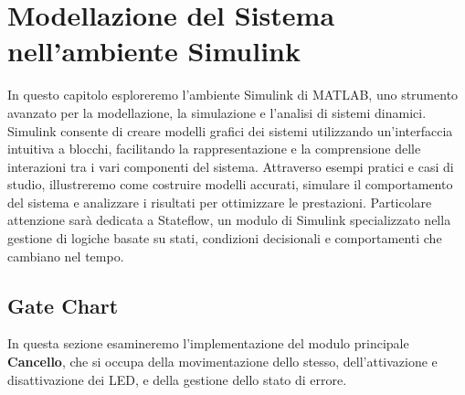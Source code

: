 \boldmath

\chapter{Modellazione del Sistema nell'ambiente Simulink}

    \noindent In questo capitolo esploreremo l'ambiente Simulink di MATLAB, uno strumento avanzato per la modellazione, la simulazione e l'analisi di sistemi dinamici. Simulink consente di creare modelli grafici dei sistemi utilizzando un'interfaccia intuitiva a blocchi, facilitando la rappresentazione e la comprensione delle interazioni tra i vari componenti del sistema. Attraverso esempi pratici e casi di studio, illustreremo come costruire modelli accurati, simulare il comportamento del sistema e analizzare i risultati per ottimizzare le prestazioni. Particolare attenzione sarà dedicata a Stateflow, un modulo di Simulink specializzato nella gestione di logiche basate su stati, condizioni decisionali e comportamenti che cambiano nel tempo.

    \section{Gate Chart}
        In questa sezione esamineremo l'implementazione del modulo principale \textbf{Cancello}, che si occupa della movimentazione dello stesso, dell'attivazione e disattivazione dei LED, e della gestione dello stato di errore.

        \newpage
            
